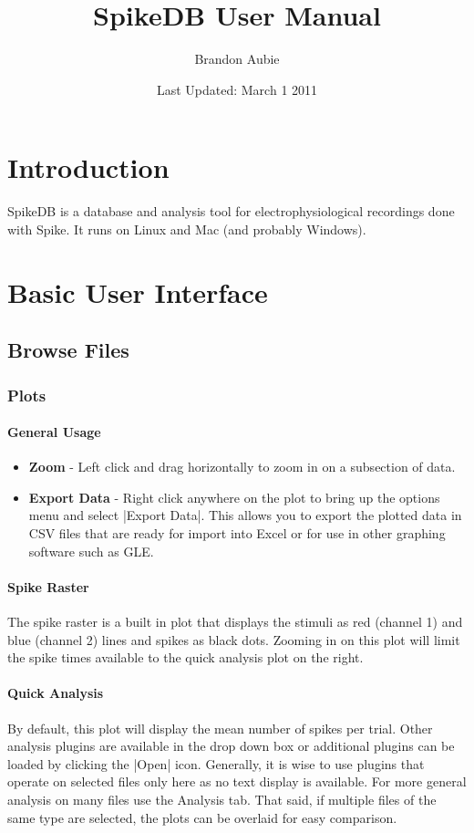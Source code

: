 \documentclass{report}
\title{SpikeDB User Manual}
\author{Brandon Aubie}
\date{Last Updated: March 1 2011}
\begin{document}

\maketitle
\tableofcontents 

\chapter{Introduction}
SpikeDB is a database and analysis tool for electrophysiological recordings done with Spike. It runs on Linux and Mac (and probably Windows).

\chapter{Basic User Interface}
\section{Browse Files}
\subsection{Plots}
\subsubsection{General Usage}
\begin{itemize}
	\item \textbf{Zoom} - Left click and drag horizontally to zoom in on a subsection of data.  
	\item \textbf{Export Data} - Right click anywhere on the plot to bring up the options menu and select |Export Data|. This allows you to export the plotted data in CSV files that are ready for import into Excel or for use in other graphing software such as GLE.
\end{itemize}

\subsubsection{Spike Raster}
The spike raster is a built in plot that displays the stimuli as red (channel 1) and blue (channel 2) lines and spikes as black dots. Zooming in on this plot will limit the spike times available to the quick analysis plot on the right.

\subsubsection{Quick Analysis}
By default, this plot will display the mean number of spikes per trial. Other analysis plugins are available in the drop down box or additional plugins can be loaded by clicking the |Open| icon. Generally, it is wise to use plugins that operate on selected files only here as no text display is available. For more general analysis on many files use the Analysis tab. That said, if multiple files of the same type are selected, the plots can be overlaid for easy comparison.
\end{document}

